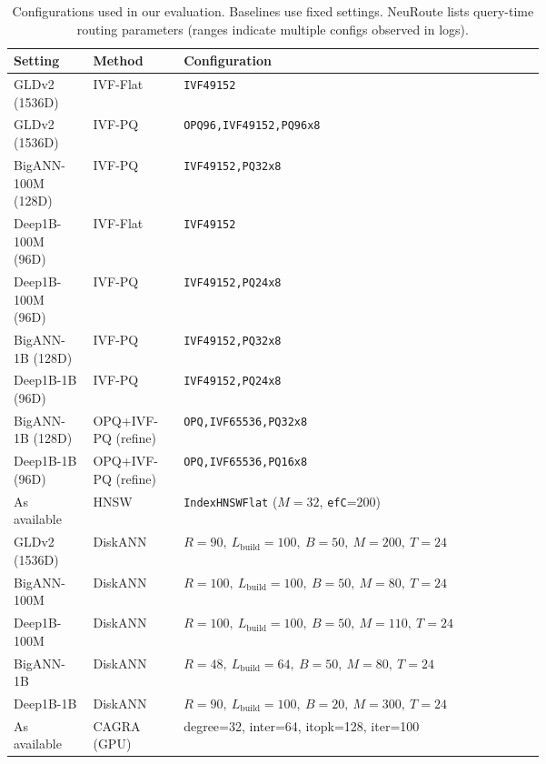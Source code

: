 \documentclass[sigconf, nonacm]{acmart}
\begin{document}
\begin{table}[t]
\centering
\footnotesize
\setlength{\tabcolsep}{3pt}
\renewcommand{\arraystretch}{1.02}
\caption{Configurations used in our evaluation. Baselines use fixed settings. NeuRoute lists query-time routing parameters (ranges indicate multiple configs observed in logs).}
\label{tab:baseline_config}
\begin{adjustbox}{max width=\linewidth}
\begin{tabular}{@{}llp{0.68\linewidth}@{}}
\toprule
Setting & Method & Configuration \\
\midrule
GLDv2 (1536D) & IVF-Flat & \texttt{IVF49152} \\
GLDv2 (1536D) & IVF-PQ & \texttt{OPQ96,IVF49152,PQ96x8} \\
\midrule
BigANN-100M (128D) & IVF-PQ & \texttt{IVF49152,PQ32x8} \\
Deep1B-100M (96D) & IVF-Flat & \texttt{IVF49152} \\
Deep1B-100M (96D) & IVF-PQ & \texttt{IVF49152,PQ24x8} \\
\midrule
BigANN-1B (128D) & IVF-PQ & \texttt{IVF49152,PQ32x8} \\
Deep1B-1B (96D) & IVF-PQ & \texttt{IVF49152,PQ24x8} \\
BigANN-1B (128D) & OPQ+IVF-PQ (refine) & \texttt{OPQ,IVF65536,PQ32x8} \\
Deep1B-1B (96D) & OPQ+IVF-PQ (refine) & \texttt{OPQ,IVF65536,PQ16x8} \\
\midrule
As available & HNSW & \texttt{IndexHNSWFlat} ($M{=}32$, \texttt{efC}{=}200) \\
GLDv2 (1536D) & DiskANN & $R{=}90,\ L_{\mathrm{build}}{=}100,\ B{=}50,\ M{=}200,\ T{=}24$ \\
BigANN-100M & DiskANN & $R{=}100,\ L_{\mathrm{build}}{=}100,\ B{=}50,\ M{=}80,\ T{=}24$ \\
Deep1B-100M & DiskANN & $R{=}100,\ L_{\mathrm{build}}{=}100,\ B{=}50,\ M{=}110,\ T{=}24$ \\
BigANN-1B & DiskANN & $R{=}48,\ L_{\mathrm{build}}{=}64,\ B{=}50,\ M{=}80,\ T{=}24$ \\
Deep1B-1B & DiskANN & $R{=}90,\ L_{\mathrm{build}}{=}100,\ B{=}20,\ M{=}300,\ T{=}24$ \\
As available & CAGRA (GPU) & degree=32, inter=64, itopk=128, iter=100 \\


\end{tabular}
\end{adjustbox}
\end{table}
\end{document}
